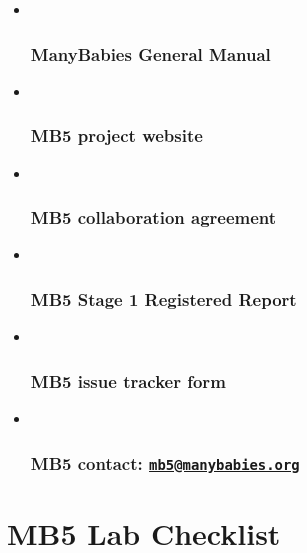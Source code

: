 \documentclass[
]{book}
\begin{document}
\begin{itemize}
\item ~
  \subsubsection*{ManyBabies General Manual}\label{manybabies-general-manual}
\item ~
  \subsubsection*{MB5 project website}\label{mb5-project-website}
\item ~
  \subsubsection*{MB5 collaboration agreement}\label{mb5-collaboration-agreement}
\item ~
  \subsubsection*{MB5 Stage 1 Registered Report}\label{mb5-stage-1-registered-report}
\item ~
  \subsubsection{MB5 issue tracker form}\label{mb5-issue-tracker-form}
\item ~
  \subsubsection*{\texorpdfstring{MB5 contact: \href{mailto:mb5@manybabies.org}{\nolinkurl{mb5@manybabies.org}} }{MB5 contact: mb5@manybabies.org }}\label{mb5-contact-mb5manybabies.org}
\end{itemize}

\section*{MB5 Lab Checklist}\label{mb5-lab-checklist}
\end{document}
